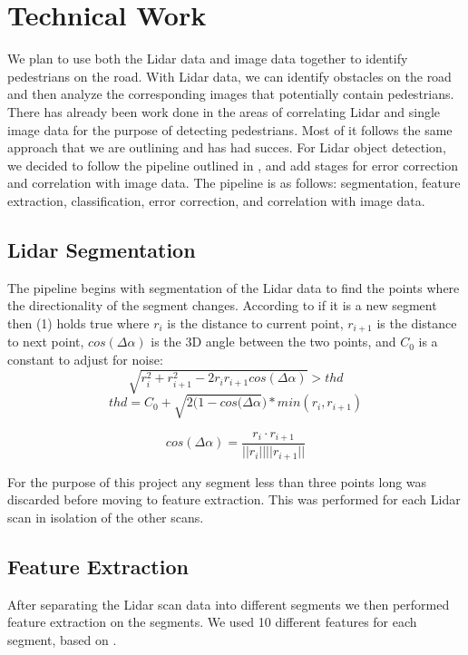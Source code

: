 \documentclass[10pt,twocolumn,letterpaper]{article}
\begin{document}
\section{Technical Work}

  We plan to use both the Lidar data and image data together to identify
  pedestrians on the road. With Lidar data, we can identify obstacles on the
  road and then analyze the corresponding images that potentially contain
  pedestrians. There has already been work done in the areas of correlating
  Lidar and single image data for the purpose of detecting pedestrians. Most
  of it follows the same approach that we are outlining and has had succes.
  For Lidar object detection, we decided to follow the pipeline outlined
  in \cite{journal}, and add stages for error correction and correlation with
  image data. The pipeline is as follows: segmentation, feature
  extraction, classification, error correction, and correlation with image data.

  \subsection{Lidar Segmentation}
  The pipeline begins with segmentation of the Lidar data
  to find the points where the directionality of the segment changes.
  According to \cite{conf} if it
  is a new segment then (1) holds true where $r_i$ is the
  distance to current point, $r_{i+1}$ is the distance to next point,
  $cos(\Delta \alpha)$ is the 3D angle between the two points, and $C_0$ is a
  constant to adjust for noise:
   \begin{equation} \sqrt{r_{i}^{2} + r_{i+1}^{2} - 2 r_{i} r_{i+1}
   cos(\Delta \alpha)} > thd \end{equation}
   \begin{equation} thd = C_0 + \sqrt{2(1-cos(\Delta \alpha}) * min(r_i,
   r_{i+1}) \end{equation}

   \begin{equation}  cos(\Delta \alpha) = \frac{r_i \cdot r_{i+1}}
   {||r_i||||r_{i+1}||} \end{equation}

  For the purpose of this project any segment less than three points long was
  discarded before moving to feature extraction. This was performed for each
  Lidar scan in isolation of the other scans.

  \subsection{Feature Extraction}
  After separating the Lidar scan data into different segments we then
  performed feature extraction on the segments. We used 10 different features
  for each segment, based on \cite{journal}.
\end{document}

